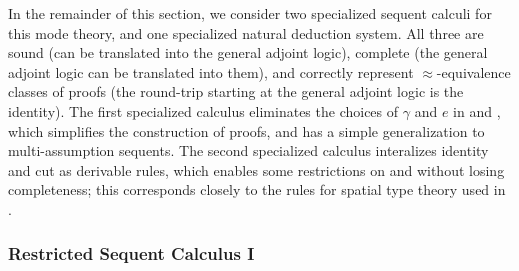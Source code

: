 \documentclass{drl-common/llncs}
\renewcommand\irl[1]{\dsd{#1}}
\newcommand\ap[2]{\ensuremath{#1 \approx #2}}
\begin{document}
In the remainder of this section, we consider two specialized sequent
calculi for this mode theory, and one specialized natural deduction
system.  All three are sound (can be translated into the general adjoint
logic), complete (the general adjoint logic can be translated into
them), and correctly represent \ap{}{}-equivalence classes of proofs
(the round-trip starting at the general adjoint logic is the identity).
The first specialized calculus eliminates the choices of $\gamma$ and
$e$ in \irl{FL} and \irl{UR}, which simplifies the construction of
proofs, and has a simple generalization to multi-assumption sequents.
The second specialized calculus interalizes identity and cut as
derivable rules, which enables some restrictions on \irl{FL} and
\irl{Case} without losing completeness; this corresponds closely to the
rules for spatial type theory used in \citep{shulman15realcohesion}.    

\subsubsection{Restricted Sequent Calculus I}
\end{document}
